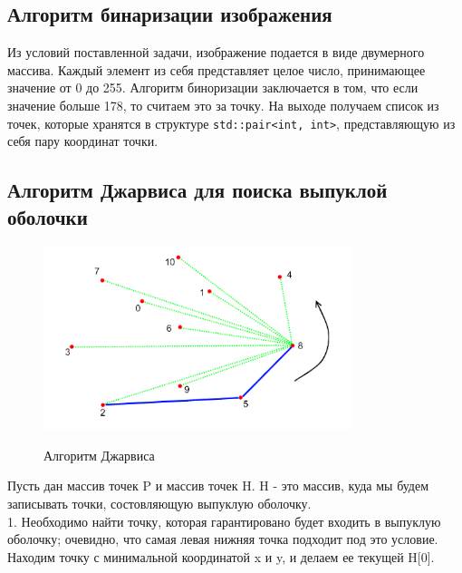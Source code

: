 \documentclass[a4paper, 12pt]{article}
\begin{document}




\subsection{Алгоритм бинаризации изображения}

Из условий поставленной задачи, изображение подается в виде двумерного массива. Каждый элемент из себя представляет целое число, принимающее значение от 0 до 255. Алгоритм биноризации заключается в том, что если значение больше 178, то считаем это за точку. На выходе получаем список из точек, которые хранятся в структуре  \texttt{std::pair<int, int>}, представляющую из себя пару координат точки.\\[2mm]\newline

\subsection{Алгоритм Джарвиса для поиска выпуклой оболочки}

\begin{figure}[h!]
    \centering
    \includegraphics[width=0.8\textwidth]{images/jarvis.png}\\[5mm]
    \caption{Алгоритм Джарвиса}
    \label{Алгоритм Джарвиса}
\end{figure}

Пусть дан массив точек {P} и массив точек {H}. {H} - это массив, куда мы будем записывать точки, состовляющую выпуклую оболочку.\\[2mm]

1. Необходимо найти точку, которая гарантировано будет входить в выпуклую оболочку; очевидно, что самая левая нижняя точка подходит под это условие. Находим точку с минимальной координатой {x} и {y}, и делаем ее текущей {H[0]}.
\end{document}
